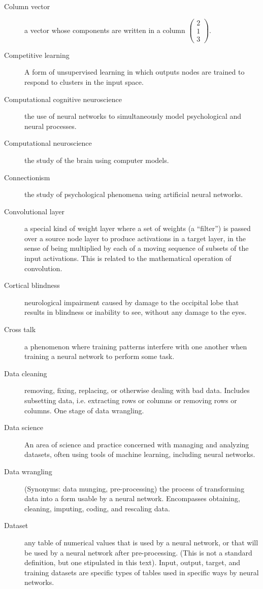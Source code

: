 \begin{description}
\item[Column vector] a vector whose components are written in a column \eg $\displaystyle \begin{pmatrix} 2 \\ 1 \\ 3 \end{pmatrix}$.
\item[Competitive learning] A form of unsupervised learning in which outputs nodes are trained to respond to clusters in the input space. 
\item[Computational cognitive neuroscience] the use of neural networks to simultaneously model psychological and neural processes.
\item[Computational neuroscience] the study of the brain using computer models.
\item[Connectionism] the study of psychological phenomena using artificial neural networks.
\item[Convolutional layer] a special kind of weight layer where a set of weights (a ``filter'') is passed over a source node layer to produce activations in a target layer, in the sense of being multiplied by each of a moving sequence of subsets of the input activations. This is related to the mathematical operation of convolution.
\item[Cortical blindness] neurological impairment caused by damage to the occipital lobe that results in blindness or inability to see, without any damage to the eyes. 
\item[Cross talk] a phenomenon where training patterns interfere with one another when training a neural network to perform some task. 
\item[Data cleaning] removing, fixing, replacing, or otherwise dealing with bad data. Includes subsetting data, i.e. extracting rows or columns or removing rows or columns. One stage of data wrangling.
\item[Data science]  An area of science and practice concerned with managing and analyzing datasets, often using tools of machine learning, including neural networks.
\item[Data wrangling] (Synonyms: data munging, pre-processing) the process of transforming data into a form usable by a neural network. Encompasses obtaining, cleaning, imputing, coding, and rescaling data. 
\item[Dataset] any table of numerical values that is used by a neural network, or that will be used by a neural network after pre-processing. (This is not a standard definition, but one stipulated in this text). Input, output, target, and training datasets are specific types of tables used in specific ways by neural networks.

\end{description}
